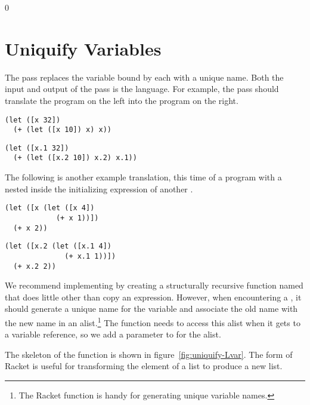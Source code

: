 \documentclass[7x10]{TimesAPriori_MIT}%
\def\racketEd{0}
\def\edition{1}
\numberwithin{theorem}{chapter}
\numberwithin{definition}{chapter}
\numberwithin{equation}{chapter}
\begin{document}
{\if\edition\racketEd  
\section{Uniquify Variables}
\label{sec:uniquify-Lvar}

The  pass replaces the variable bound by each 
with a unique name. Both the input and output of the 
pass is the \LangVar{} language. For example, the  pass
should translate the program on the left into the program on the
right.
\begin{transformation}
\begin{lstlisting}
(let ([x 32])
  (+ (let ([x 10]) x) x))
\end{lstlisting}
\compilesto
\begin{lstlisting}
(let ([x.1 32])
  (+ (let ([x.2 10]) x.2) x.1))
\end{lstlisting}
\end{transformation}
The following is another example translation, this time of a program
with a  nested inside the initializing expression of another
.
\begin{transformation}
\begin{lstlisting}
(let ([x (let ([x 4])
            (+ x 1))])
  (+ x 2))
\end{lstlisting}
\compilesto
\begin{lstlisting}
(let ([x.2 (let ([x.1 4])
              (+ x.1 1))])
  (+ x.2 2))
\end{lstlisting}
\end{transformation}

We recommend implementing  by creating a structurally
recursive function named  that does little other
than copy an expression. However, when encountering a , it
should generate a unique name for the variable and associate the old
name with the new name in an alist.\footnote{The Racket function
   is handy for generating unique variable names.} The
 function needs to access this alist when it gets
to a variable reference, so we add a parameter to 
for the alist.

The skeleton of the  function is shown in
figure~\ref{fig:uniquify-Lvar}.
The
%
\href{https://docs.racket-lang.org/reference/for.html#%28form._%28%28lib._racket%2Fprivate%2Fbase..rkt%29._for%2Flist%29%29}{\key{for/list}}
%
form of Racket is useful for transforming the element of a list to
produce a new list.

}
\end{document}
